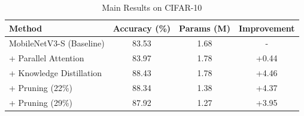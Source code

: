 
\begin{table}[h]
\centering
\caption{Main Results on CIFAR-10}
\label{tab:main_results}
\begin{tabular}{lccc}
\toprule
Method & Accuracy (\%) & Params (M) & Improvement \\
\midrule
MobileNetV3-S (Baseline) & 83.53 & 1.68 & - \\
+ Parallel Attention & 83.97 & 1.78 & +0.44 \\
+ Knowledge Distillation & 88.43 & 1.78 & +4.46 \\
+ Pruning (22\%) & 88.34 & 1.38 & +4.37 \\
+ Pruning (29\%) & 87.92 & 1.27 & +3.95 \\
\bottomrule
\end{tabular}
\end{table}
